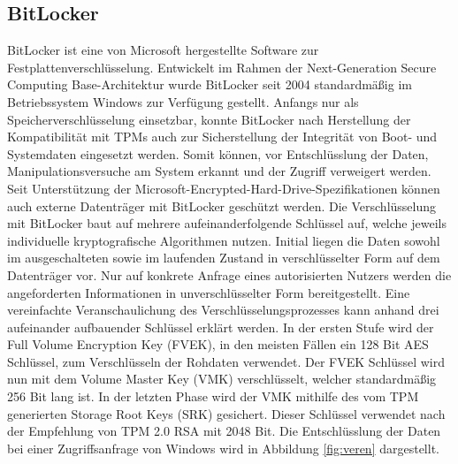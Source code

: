 \documentclass[conference]{IEEEtran}
\begin{document}
\subsection{BitLocker}
BitLocker \cite{Dansimp.13122021} ist eine von Microsoft hergestellte Software zur Festplattenverschlüsselung. Entwickelt im Rahmen der Next-Generation Secure Computing Base-Architektur \cite{YuJianji.} wurde BitLocker seit 2004 standardmäßig im Betriebssystem Windows zur Verfügung gestellt. Anfangs nur als Speicherverschlüsselung einsetzbar, konnte BitLocker nach Herstellung der Kompatibilität mit TPMs auch zur Sicherstellung der Integrität von Boot- und Systemdaten eingesetzt werden. Somit können, vor Entschlüsslung der Daten, Manipulationsversuche am System erkannt und der Zugriff verweigert werden. Seit Unterstützung der Microsoft-Encrypted-Hard-Drive-Spezifikationen können auch externe Datenträger mit BitLocker geschützt werden. Die Verschlüsselung mit BitLocker baut auf mehrere aufeinanderfolgende Schlüssel auf, welche jeweils individuelle kryptografische Algorithmen nutzen. Initial liegen die Daten sowohl im ausgeschalteten sowie im laufenden Zustand in verschlüsselter Form auf dem Datenträger vor. Nur auf konkrete Anfrage eines autorisierten Nutzers werden die angeforderten Informationen in unverschlüsselter Form bereitgestellt. Eine vereinfachte Veranschaulichung des Verschlüsselungsprozesses kann anhand drei aufeinander aufbauender Schlüssel erklärt werden. In der ersten Stufe wird der Full Volume Encryption Key (FVEK), in den meisten Fällen ein 128 Bit AES Schlüssel, zum Verschlüsseln der Rohdaten verwendet. Der FVEK Schlüssel wird nun mit dem Volume Master Key (VMK) verschlüsselt, welcher standardmäßig 256 Bit lang ist. In der letzten Phase wird der VMK mithilfe des vom TPM generierten Storage Root Keys (SRK) gesichert. Dieser Schlüssel verwendet nach der Empfehlung von TPM 2.0 RSA mit 2048 Bit. Die Entschlüsslung der Daten bei einer Zugriffsanfrage von Windows wird in Abbildung \ref{fig:veren} dargestellt.
\end{document}
